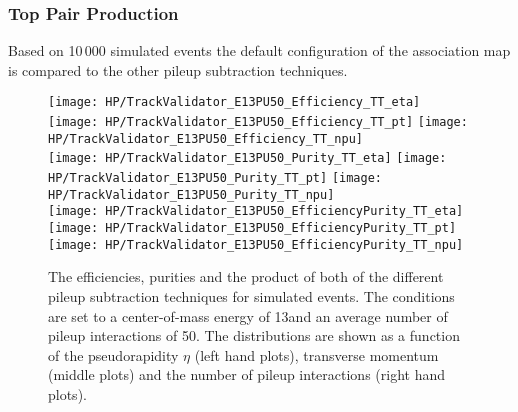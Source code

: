 \subsubsection{Top Pair Production}

Based on 10\,000 simulated \ttbar events the default configuration of the association map is compared to the other pileup subtraction techniques.

\begin{figure}[!h]
  \centering
  \texttt{[image: HP/TrackValidator\_E13PU50\_Efficiency\_TT\_eta]}
  \texttt{[image: HP/TrackValidator\_E13PU50\_Efficiency\_TT\_pt]}
  \texttt{[image: HP/TrackValidator\_E13PU50\_Efficiency\_TT\_npu]}
   \\
  \texttt{[image: HP/TrackValidator\_E13PU50\_Purity\_TT\_eta]}
  \texttt{[image: HP/TrackValidator\_E13PU50\_Purity\_TT\_pt]}
  \texttt{[image: HP/TrackValidator\_E13PU50\_Purity\_TT\_npu]}
   \\
  \texttt{[image: HP/TrackValidator\_E13PU50\_EfficiencyPurity\_TT\_eta]}
  \texttt{[image: HP/TrackValidator\_E13PU50\_EfficiencyPurity\_TT\_pt]}
  \texttt{[image: HP/TrackValidator\_E13PU50\_EfficiencyPurity\_TT\_npu]}
  \caption[Efficiencies, purities and their product of the different pileup subtraction techniques for simulated \ttbar events with 13\TeV and PU=50]{The efficiencies, purities and the product of both of the different pileup subtraction techniques for simulated \ttbar events. The conditions are set to a center-of-mass energy of 13\TeV and an average number of pileup interactions of 50. The distributions are shown as a function of the pseudorapidity $\eta$ (left hand plots), transverse momentum (middle plots) and the number of pileup interactions (right hand plots).}
\end{figure}
\clearpage

